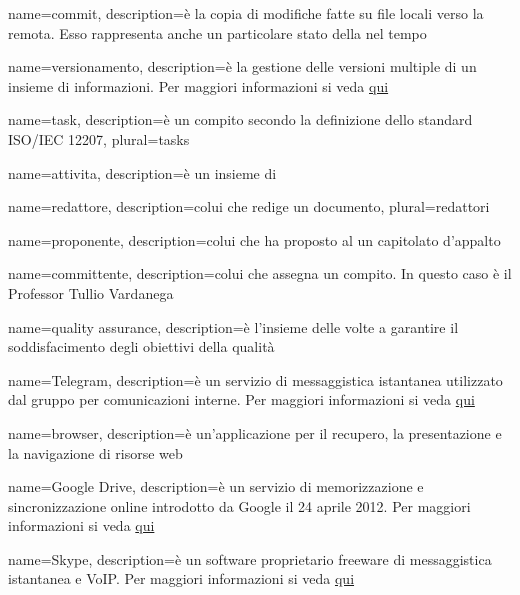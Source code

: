  {
	name=commit,
	description={è la copia di modifiche fatte su file locali verso la  remota. Esso rappresenta anche un particolare stato della  nel tempo}
}

 {
	name=versionamento,
	description={è la gestione delle versioni multiple di un insieme di informazioni. Per maggiori informazioni si veda \href{http://it. wikipedia.org/wiki/Controllo_versione}{qui}}
}

 {
	name=task,
	description={è un compito secondo la definizione dello standard ISO/IEC 12207},
	plural=tasks
}

 {
	name=attivita,
	description={è un insieme di }
}

 {
	name=redattore,
	description={colui che redige un documento},
	plural=redattori
}

 {
	name=proponente,
	description={colui che ha proposto al  un capitolato d'appalto}
}

 {
	name=committente,
	description={colui che assegna un compito. In questo caso è il Professor Tullio Vardanega}
}

 {
	name=quality assurance,
	description={è l'insieme delle  volte a garantire il soddisfacimento degli obiettivi della qualità}
}

 {
	name=Telegram,
	description={è un servizio di messaggistica istantanea utilizzato dal gruppo per comunicazioni interne. Per maggiori informazioni si veda \href{https://it.wikipedia.org/wiki/Telegram_(software)}{qui}}
}

 {
	name=browser,
	description={è un'applicazione per il recupero, la presentazione e la navigazione di risorse web}
}

 {
	name=Google Drive,
	description={è un servizio di memorizzazione e sincronizzazione online introdotto da Google il 24 aprile 2012. Per maggiori informazioni si veda \href{https://it.wikipedia.org/wiki/Google_Drive}{qui}}
}

 {
	name=Skype,
	description={è un software proprietario freeware di messaggistica istantanea e VoIP. Per maggiori informazioni si veda \href{https://it.wikipedia.org/wiki/Skype}{qui}}
}


